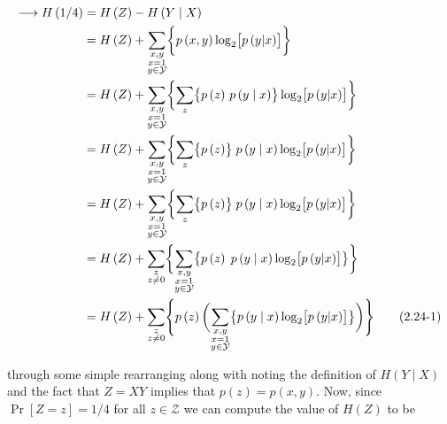 \documentclass[ClusteringConnectionsMAIN.tex]{subfiles}
\begin{document}
\begin{align} \label{c2p24eq1}
\longrightarrow H \left( 1/4 \right) &= H \left( Z \right) - H \left( Y \mid X \right) \notag \\
&= H \left( Z \right) + \sum_{\substack{x, y \\ x = 1 \\ y \in \mathcal{Y}}} \biggl\{ p \left( x, y \right) \log_2 \bigl[ p \left( y | x \right) \bigr] \biggr\}  \notag \\
&= H \left( Z \right) + \sum_{\substack{x, y \\ x = 1 \\ y \in \mathcal{Y}}} \biggl\{ \sum_{z} \bigl\{ p \left( z \right) \, p \left( y \mid x \right) \bigr\} \log_2 \bigl[ p \left( y | x \right) \bigr] \biggr\}  \notag \\
&= H \left( Z \right) + \sum_{\substack{x, y \\ x = 1 \\ y \in \mathcal{Y}}} \biggl\{ \sum_{z} \bigl\{ p \left( z \right) \bigr\} \; p \left( y \mid x \right) \log_2 \bigl[ p \left( y | x \right) \bigr] \biggr\}  \notag \\
&= H \left( Z \right) + \sum_{\substack{x, y \\ x = 1 \\ y \in \mathcal{Y}}} \biggl\{ \sum_z \bigl\{ p \left( z \right) \bigr\} \; p \left( y \mid x \right) \log_2 \bigl[ p \left( y | x \right) \bigr] \biggr\}  \notag \\
&= H \left( Z \right) + \sum_{\substack{z \\ z \neq 0}}  \biggl\{ \sum_{\substack{x, y \\ x = 1 \\ y \in \mathcal{Y}}} \bigl\{ p \left( z \right) \; p \left( y \mid x \right) \log_2 \bigl[ p \left( y | x \right) \bigr] \bigr\} \biggr\}  \notag \\
&= H \left( Z \right) + \sum_{\substack{z \\ z \neq 0}} \Biggl\{ p \left( z \right) \biggl( \sum_{\substack{x, y \\ x = 1 \\ y \in \mathcal{Y}}} \bigl\{ p \left( y \mid x \right) \log_2 \bigl[ p \left( y | x \right) \bigr] \bigr\} \biggr) \Biggr\} \tag{2.24-1}
\end{align}

through some simple rearranging along with noting the definition of $H \left( Y \mid X \right)$ and the fact that $Z = X Y$ implies that $p \left( z \right) = p \left( x, y \right)$.  Now, since $\Pr \left[ Z = z \right] = 1 / 4$ for all $z \in \mathcal{Z}$ we can compute the value of $H \left( Z \right)$ to be
\end{document}
